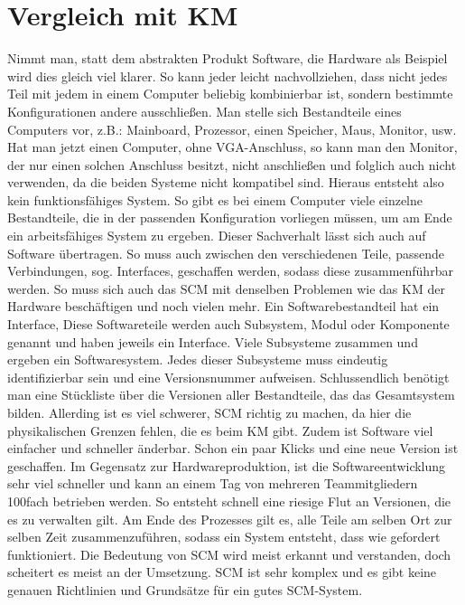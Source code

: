 \section{Vergleich mit KM}
Nimmt man, statt dem abstrakten Produkt Software, die Hardware als Beispiel wird dies gleich viel klarer. So kann jeder leicht nachvollziehen, dass nicht jedes Teil mit jedem in einem Computer beliebig kombinierbar ist, sondern bestimmte Konfigurationen andere ausschließen. Man stelle sich Bestandteile eines Computers vor, z.B.: Mainboard, Prozessor, einen Speicher, Maus, Monitor, usw. Hat man jetzt einen Computer, ohne VGA-Anschluss, so kann man den Monitor, der nur einen solchen Anschluss besitzt, nicht anschließen und folglich auch nicht verwenden, da die beiden Systeme nicht kompatibel sind. Hieraus entsteht also kein funktionsfähiges System. So gibt es bei einem Computer viele einzelne Bestandteile, die in der passenden Konfiguration vorliegen müssen, um am Ende ein arbeitsfähiges System zu ergeben. Dieser Sachverhalt lässt sich auch auf Software übertragen. So muss auch zwischen den verschiedenen Teile, passende Verbindungen, sog. Interfaces, geschaffen werden, sodass diese zusammenführbar werden. So muss sich auch das SCM mit denselben Problemen wie das KM der Hardware beschäftigen und noch vielen mehr. Ein Softwarebestandteil hat ein Interface, Diese Softwareteile werden auch Subsystem, Modul oder Komponente genannt und haben jeweils ein Interface. Viele Subsysteme zusammen und ergeben ein Softwaresystem. Jedes dieser Subsysteme muss eindeutig identifizierbar sein und eine Versionsnummer aufweisen. Schlussendlich benötigt man eine Stückliste über die Versionen aller Bestandteile, das das Gesamtsystem bilden. Allerding ist es viel schwerer, SCM richtig zu machen, da hier die physikalischen Grenzen fehlen, die es beim KM gibt. Zudem ist Software viel einfacher und schneller änderbar. Schon ein paar Klicks und eine neue Version ist geschaffen. Im  Gegensatz zur Hardwareproduktion, ist die Softwareentwicklung sehr viel schneller und kann an einem Tag von mehreren Teammitgliedern 100fach  betrieben werden. So entsteht schnell eine riesige Flut an Versionen, die es zu verwalten gilt. Am Ende des Prozesses gilt es, alle Teile am selben Ort zur selben Zeit zusammenzuführen, sodass ein System entsteht, dass wie gefordert funktioniert. Die Bedeutung von SCM wird meist erkannt und verstanden, doch scheitert es meist an der Umsetzung. SCM ist sehr komplex und es gibt keine genauen Richtlinien und Grundsätze für ein gutes SCM-System. 

